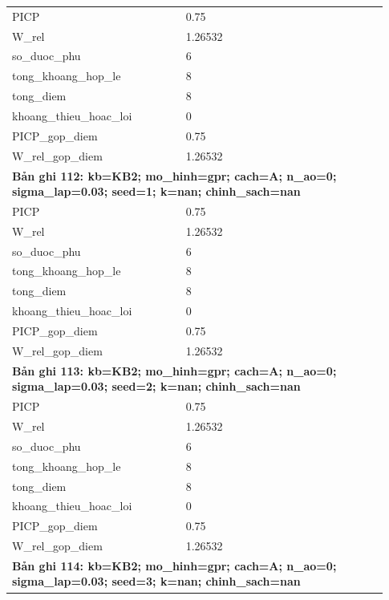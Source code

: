 \begin{longtable}{p{0.43\linewidth}p{0.50\linewidth}}
PICP & 0.75 \\
W\_\allowbreak rel & 1.26532 \\
so\_\allowbreak duoc\_\allowbreak phu & 6 \\
tong\_\allowbreak khoang\_\allowbreak hop\_\allowbreak le & 8 \\
tong\_\allowbreak diem & 8 \\
khoang\_\allowbreak thieu\_\allowbreak hoac\_\allowbreak loi & 0 \\
PICP\_\allowbreak gop\_\allowbreak diem & 0.75 \\
W\_\allowbreak rel\_\allowbreak gop\_\allowbreak diem & 1.26532 \\
\midrule
\multicolumn{2}{p{0.95\linewidth}}{\textbf{Bản ghi 112: kb=KB2; mo\_hinh=gpr; cach=A; n\_ao=0; sigma\_lap=0.03; seed=1; k=nan; chinh\_sach=nan}} \\
PICP & 0.75 \\
W\_\allowbreak rel & 1.26532 \\
so\_\allowbreak duoc\_\allowbreak phu & 6 \\
tong\_\allowbreak khoang\_\allowbreak hop\_\allowbreak le & 8 \\
tong\_\allowbreak diem & 8 \\
khoang\_\allowbreak thieu\_\allowbreak hoac\_\allowbreak loi & 0 \\
PICP\_\allowbreak gop\_\allowbreak diem & 0.75 \\
W\_\allowbreak rel\_\allowbreak gop\_\allowbreak diem & 1.26532 \\
\midrule
\multicolumn{2}{p{0.95\linewidth}}{\textbf{Bản ghi 113: kb=KB2; mo\_hinh=gpr; cach=A; n\_ao=0; sigma\_lap=0.03; seed=2; k=nan; chinh\_sach=nan}} \\
PICP & 0.75 \\
W\_\allowbreak rel & 1.26532 \\
so\_\allowbreak duoc\_\allowbreak phu & 6 \\
tong\_\allowbreak khoang\_\allowbreak hop\_\allowbreak le & 8 \\
tong\_\allowbreak diem & 8 \\
khoang\_\allowbreak thieu\_\allowbreak hoac\_\allowbreak loi & 0 \\
PICP\_\allowbreak gop\_\allowbreak diem & 0.75 \\
W\_\allowbreak rel\_\allowbreak gop\_\allowbreak diem & 1.26532 \\
\midrule
\multicolumn{2}{p{0.95\linewidth}}{\textbf{Bản ghi 114: kb=KB2; mo\_hinh=gpr; cach=A; n\_ao=0; sigma\_lap=0.03; seed=3; k=nan; chinh\_sach=nan}} \\

\end{longtable}
